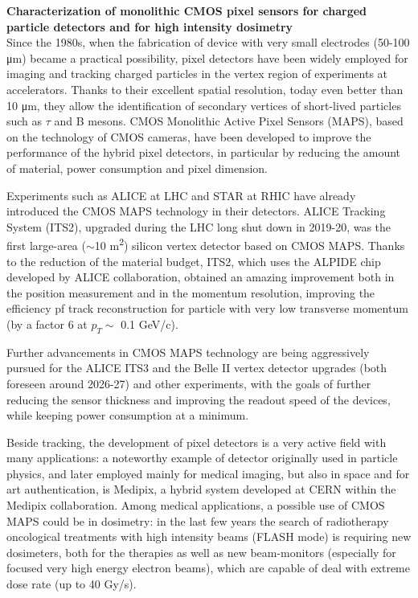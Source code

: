\documentclass[a4paper]{report}
\begin{document}
\textbf{Characterization of monolithic CMOS pixel sensors for charged particle detectors and for high intensity dosimetry}\\


Since the 1980s, when the fabrication of device with very small electrodes (50-100 \si{\um}) became a practical possibility, pixel detectors have been widely employed for imaging and tracking charged particles in the vertex region of experiments at accelerators. Thanks to their excellent spatial resolution, today even better than 10 \si{\um}, they allow the identification of secondary vertices of short-lived particles such as $\tau$ and B mesons. 
CMOS Monolithic Active Pixel Sensors (MAPS), based on the technology of CMOS cameras, have been developed to improve the performance of the hybrid pixel detectors, in particular by reducing the amount of material, power consumption and pixel dimension.  

Experiments such as ALICE at LHC and STAR at RHIC have already introduced the CMOS MAPS technology in their detectors. ALICE Tracking System (ITS2), upgraded during the LHC long shut down in 2019-20, was the first large-area ($\sim$10 \si{m^2}) silicon vertex detector based on CMOS MAPS. Thanks to the reduction of the material budget, ITS2, which uses the ALPIDE chip developed by ALICE collaboration, obtained an amazing improvement both in the position measurement and in the momentum resolution, improving the efficiency pf track reconstruction for particle with very low transverse momentum (by a factor 6 at $p_{T}\sim$ 0.1 \si{GeV/c}).

Further advancements in CMOS MAPS technology are being aggressively pursued for the ALICE ITS3 and the Belle II vertex detector upgrades (both foreseen around 2026-27) and other experiments, with the goals of further reducing the sensor thickness and improving the readout speed of the devices, while keeping power consumption at a minimum.

Beside tracking, the development of pixel detectors is a very active field with many applications: a noteworthy example of detector originally used in particle physics, and later employed mainly for medical imaging, but also in space and for art authentication, is Medipix, a hybrid system developed at CERN within the Medipix collaboration.
Among medical applications, a possible use of CMOS MAPS could be in dosimetry: in the last few years the search of radiotherapy oncological treatments with high intensity beams (FLASH mode) is requiring new dosimeters, both for the therapies as well as new beam-monitors (especially for focused very high energy electron beams), which are capable of deal with extreme dose rate (up to 40 \si{Gy/s}).
\end{document}
